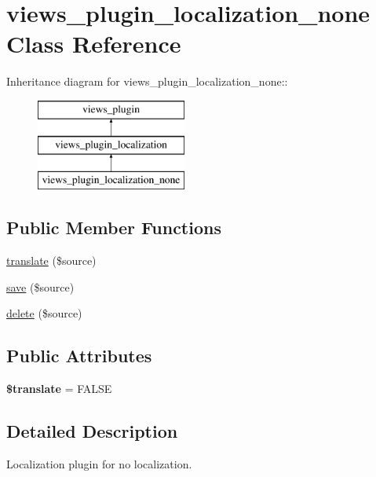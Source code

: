 \hypertarget{classviews__plugin__localization__none}{
\section{views\_\-plugin\_\-localization\_\-none Class Reference}
\label{classviews__plugin__localization__none}
}
Inheritance diagram for views\_\-plugin\_\-localization\_\-none::\begin{figure}[H]
\begin{center}
\leavevmode
\includegraphics[height=3cm]{classviews__plugin__localization__none}
\end{center}
\end{figure}
\subsection*{Public Member Functions}
\begin{DoxyCompactItemize}
\item 
\hyperlink{classviews__plugin__localization__none_a2fcd5143ca56317256a13291e91c6c89}{translate} (\$source)
\item 
\hyperlink{classviews__plugin__localization__none_a8c0a923ab826b285bea27b9c5097effd}{save} (\$source)
\item 
\hyperlink{classviews__plugin__localization__none_ad92bca64ae753d74f2f61d41e2638625}{delete} (\$source)
\end{DoxyCompactItemize}
\subsection*{Public Attributes}
\begin{DoxyCompactItemize}
\item 
\hypertarget{classviews__plugin__localization__none_a729b32b4886e7f8dea9637fb2662d805}{
{\bfseries \$translate} = FALSE}
\label{classviews__plugin__localization__none_a729b32b4886e7f8dea9637fb2662d805}

\end{DoxyCompactItemize}


\subsection{Detailed Description}
Localization plugin for no localization. 

